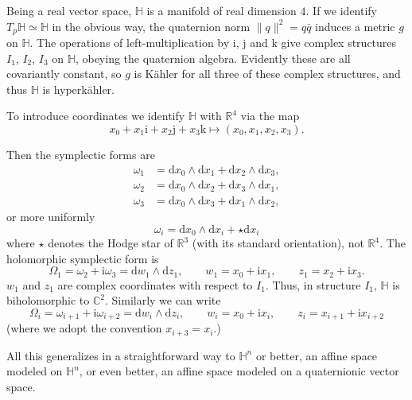 \documentclass[12pt,letterpaper,reqno]{article}
\numberwithin{equation}{section}
\newcommand{\R}{\ensuremath{\mathbb R}}
\newcommand{\C}{\ensuremath{\mathbb C}}
\newcommand{\bbH}{\ensuremath{\mathbb H}}
\newcommand{\kahler}{K\"ahler\xspace}
\newcommand{\hk}{hyperk\"ahler\xspace}
\newcommand{\I}{{\mathrm i}}
\newcommand{\J}{{\mathrm j}}
\newcommand{\K}{{\mathrm k}}
\newcommand{\de}{\mathrm{d}}
\newcommand{\norm}[1]{\lVert#1\rVert}
\begin{document}
\begin{example} \label{exa:R4}
Being a real vector space, $\bbH$ is
a manifold of real dimension $4$.
If we identify $T_p \bbH \simeq \bbH$ in the obvious way,
the quaternion norm $\norm{q}^2 = q \bar{q}$
induces a metric $g$ on $\bbH$.
The operations of left-multiplication by $\I$, $\J$ and $\K$
give complex structures $I_1$, $I_2$, $I_3$ on $\bbH$,
obeying the quaternion algebra.
Evidently these are all covariantly constant, so
$g$ is \kahler for all three of these complex
structures, and thus $\bbH$ is \hk.

To introduce coordinates we
identify $\bbH$ with $\R^4$
via the map
\begin{equation}
  x_0 + x_1 \I + x_2 \J + x_3 \K \mapsto (x_0,x_1,x_2,x_3).
\end{equation}

Then the symplectic forms are
\begin{align}
  \omega_1 &= \de x_0 \wedge \de x_1 + \de x_2 \wedge \de x_3, \\
  \omega_2 &= \de x_0 \wedge \de x_2 + \de x_3 \wedge \de x_1, \\
  \omega_3 &= \de x_0 \wedge \de x_3 + \de x_1 \wedge \de x_2,
\end{align}
or more uniformly
\begin{equation} \label{eq:symplectic-forms-R4}
  \omega_i = \de x_0 \wedge \de x_i + \star \de x_i
\end{equation}
where $\star$ denotes the Hodge star of $\R^3$ (with its 
standard orientation), not $\R^4$.
The holomorphic symplectic form is
\begin{equation}
  \Omega_1 = \omega_2 + \I \omega_3 = \de w_1 \wedge \de z_1, \qquad w_1 = x_0 + \I x_1, \qquad z_1 = x_2 + \I x_3.
\end{equation}
$w_1$ and $z_1$ are complex coordinates with respect to $I_1$.
Thus, in structure $I_1$, $\bbH$ is biholomorphic to $\C^2$.
Similarly we can write
\begin{equation} \label{eq:Omega-i-R4}
  \Omega_i = \omega_{i+1} + \I \omega_{i+2} = \de w_i \wedge \de z_i, \qquad w_i = x_0 + \I x_i, \qquad z_i = x_{i+1} + \I x_{i+2}
\end{equation}
(where we adopt the convention $x_{i+3} = x_i$.)

All this generalizes in a straightforward way to $\bbH^n$ 
or better, an affine space modeled on $\bbH^n$, or even 
better, an affine space modeled on a quaternionic vector space.
\end{example}
\end{document}
